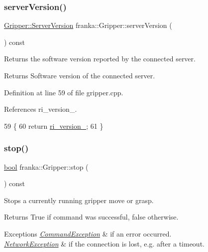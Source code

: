 \subsubsection{\texorpdfstring{server\+Version()}{serverVersion()}}
{\footnotesize\ttfamily \hyperlink{classfranka_1_1Gripper_a613bf52d9433b733685d0fb9ea71602e}{Gripper\+::\+Server\+Version} franka\+::\+Gripper\+::server\+Version (\begin{DoxyParamCaption}{ }\end{DoxyParamCaption}) const\hspace{0.3cm}{\ttfamily [noexcept]}}

Returns the software version reported by the connected server.

\begin{DoxyReturn}{Returns}
Software version of the connected server. 
\end{DoxyReturn}


Definition at line 59 of file gripper.\+cpp.



References ri\+\_\+version\+\_\+.


\begin{DoxyCode}
59                                                            \{
60   \textcolor{keywordflow}{return} \hyperlink{classfranka_1_1Gripper_ae3698ae18399317ca4a7fc4154be602f}{ri\_version\_};
61 \}
\end{DoxyCode}
\mbox{\label{classfranka_1_1Gripper_add7397fb6c5631650c139d26a85c8e1d}} 
\subsubsection{\texorpdfstring{stop()}{stop()}}
{\footnotesize\ttfamily \hyperlink{classbool}{bool} franka\+::\+Gripper\+::stop (\begin{DoxyParamCaption}{ }\end{DoxyParamCaption}) const}

Stops a currently running gripper move or grasp.

\begin{DoxyReturn}{Returns}
True if command was successful, false otherwise.
\end{DoxyReturn}

\begin{DoxyExceptions}{Exceptions}
{\em \hyperlink{structfranka_1_1CommandException}{Command\+Exception}} & if an error occurred. \\
\hline
{\em \hyperlink{structfranka_1_1NetworkException}{Network\+Exception}} & if the connection is lost, e.\+g. after a timeout. \\
\hline
\end{DoxyExceptions}


